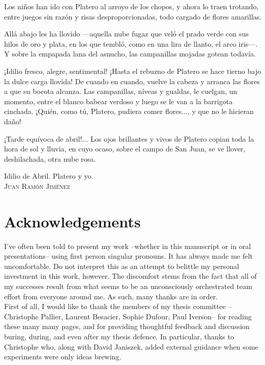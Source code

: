 \documentclass[12pt, twoside]{report}
\begin{document}
\epigraph{Los niños han ido con Platero al arroyo de los chopos, y ahora lo traen trotando, entre juegos sin razón y risas desproporcionadas, todo cargado de flores amarillas.
  
  Allá abajo les ha llovido —aquella nube fugaz que veló el prado verde con sus hilos de oro y plata, en los que tembló, como en una lira de llanto, el arco iris—. Y sobre la empapada lana del asnucho, las campanillas mojadas gotean todavía.

  ¡Idilio fresco, alegre, sentimental! ¡Hasta el rebuzno de Platero se hace tierno bajo la dulce carga llovida! De cuando en cuando, vuelve la cabeza y arranca las flores a que su bocota alcanza. Las campanillas, níveas y gualdas, le cuelgan, un momento, entre el blanco babear verdoso y luego se le van a la barrigota cinchada. ¡Quién, como tú, Platero, pudiera comer flores..., y que no le hicieran daño!

    ¡Tarde equívoca de abril!... Los ojos brillantes y vivos de Platero copian toda la hora de sol y lluvia, en cuyo ocaso, sobre el campo de San Juan, se ve llover, deshilachada, otra nube rosa.}{Idilio de Abril. Platero y yo. \\ \textsc{Juan Ramón Jiménez}}


\chapter*{Acknowledgements}
I've often been told to present my work --whether in this manuscript or in oral presentations-- using first person singular pronouns. It has always made me felt uncomfortable. Do not interpret this as an attempt to belittle my personal investment in this work, however. The discomfort stems from the fact that all of my successes result from what seems to be an unconsciously orchestrated team effort from everyone around me. As such, many thanks are in order. \\

First of all, I would like to thank the members of my thesis committee --Christophe Pallier, Laurent Besacier, Sophie Dufour, Paul Iverson-- for reading these many many pages, and for providing thoughtful feedback and discussion buring, during, and even after my thesis defence. In particular, thanks to Christophe who, along with David Janiszek, added external guidance when some experiments were only ideas brewing. \\   
\end{document}

